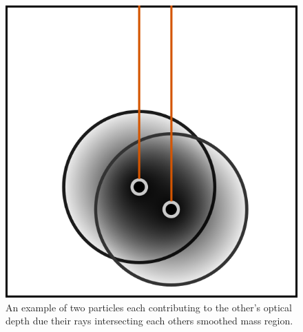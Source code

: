 \begin{figure}[H]
    \centering
    \includegraphics[width=\textwidth]{plots/CH3/ppOverlap.png}
    \caption{An example of two particles each contributing to the other's optical depth due their rays intersecting each others smoothed mass region.}
    \label{fig:ppOverlap}
\end{figure}
